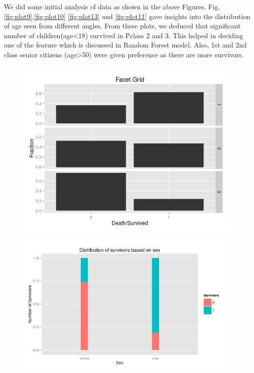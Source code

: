 We did some initial analysis of data as shown in the above Figures. Fig. \ref{fig:plot9},\ref{fig:plot10} \ref{fig:plot13} and \ref{fig:plot11} gave insights into the distribution of age seen from different angles. From these plots, we deduced that significant number of children(age<18) survived in Pclass 2 and 3. This helped in deciding one of the feature which is discussed in Random Forest model. Also, 1st and 2nd class senior citizens (age>50) were given preference as there are more survivors.

\begin{figure}
\centering
\begin{minipage}{.5\textwidth}
  \centering
  \includegraphics[width=1\linewidth]{figs/plot12}
  \label{fig:plot12}
\end{minipage}%
\begin{minipage}{.5\textwidth}
  \centering
  \includegraphics[width=1\linewidth]{figs/plot17}
  \label{fig:plot17}
\end{minipage}
\end{figure}

